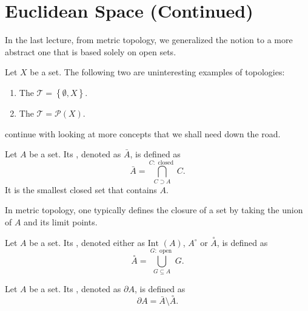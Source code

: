 \documentclass[notoc,notitlepage]{tufte-book}
\newcommand{\Int}[1]{\overset{\circ}{#1}}
\begin{document}
\section{Euclidean Space (Continued)}%
\label{sec:euclidean_space_continued}

In the last lecture, from metric topology,
we generalized the notion to a more abstract one
that is based solely on open sets.

\begin{eg}
  Let $X$ be a set. The following two are
  uninteresting examples of topologies:
  \begin{enumerate}
    \item The  $\mathcal{T} = \left\{ \emptyset, X \right\}$.
    \item The  $\mathcal{T} = \mathcal{P}(X)$.
  \end{enumerate}
\end{eg}

 continue with looking at
more concepts that we shall need down the road.

\begin{defn}\label{defn:closure_of_a_set}
  Let $A$ be a set. Its ,
  denoted as $\bar{A}$, is defined as
  \begin{equation*}
    \bar{A} = \bigcap_{C \supset A}^{C: \text{ closed }} C.
  \end{equation*}
  It is the smallest closed set that contains $A$.
\end{defn}

\begin{note}
  In metric topology, one typically defines the closure of a set by taking the union of $A$ and its limit points.
\end{note}

\begin{defn}\label{defn:interior_of_a_set}
  Let $A$ be a set. Its ,
  denoted either as $\text{Int }(A)$, $A^\circ$ or $\Int{A}$,
  is defined as
  \begin{equation*}
    \Int{A} = \bigcup_{G \subseteq A}^{G: \text{ open }} G.
  \end{equation*}
\end{defn}

\begin{defn}\label{defn:boundary_of_a_set}
  Let $A$ be a set. Its ,
  denoted as $\partial A$, is defined as
  \begin{equation*}
    \partial A = \bar{A} \setminus \Int{A}.
  \end{equation*}
\end{defn}
\end{document}
